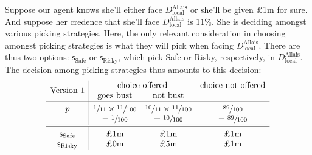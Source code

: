 \documentclass[a4paper]{article}
\newcommand\Tstrut{\rule{0pt}{2.6ex}}       %
\newcommand\Bstrut{\rule[-0.9ex]{0pt}{0pt}} %
\newcommand\s{\mathsf{s}}
\newenvironment{CCM rewritten}
{\begingroup\color{blue}} %
{\endgroup}              %
\begin{document}
Suppose our agent knows she'll either face $D^{\mathrm{Allais}}_{\mathrm{local}}$ or she'll be given \pounds1m for sure. And suppose her credence that she'll face $D^{\mathrm{Allais}}_{\mathrm{local}}$ is $11\%$. She is deciding amongst various picking strategies. 
Here, the only relevant consideration in choosing amongst picking strategies is what they will pick when facing $D^{\mathrm{Allais}}_{\mathrm{local}}$. There are thus two options: $\s_{\mathrm{Safe}}$ or $\s_{\mathrm{Risky}}$, which pick Safe or Risky, respectively, in $D^{\mathrm{Allais}}_{\mathrm{local}}$. 
The decision among picking strategies thus amounts to this decision:
%
%
	$$
\begin{array}{c|ccc}
	\multirow{2}{*}{\text{Version 1}}	&\multicolumn{2}{c}{\text{choice offered}}&\text{choice not offered}\\
	& \text{goes bust} &  \text{not bust}  \Bstrut\\\hline\Tstrut	
	p &  \sfrac{1}{11} \times \sfrac{11}{100} & \sfrac{10}{11}\times\sfrac{11}{100} & \sfrac{89}{100} \\
	& = \sfrac{1}{100} & = \sfrac{10}{100} & = \sfrac{89}{100}
		\Bstrut\\\hline\hline\Tstrut	
	\s_{\mathrm{Safe}} & \text{\pounds 1m}&\text{\pounds 1m}         &\text{\pounds 1m}               \\
	\s_{\mathrm{Risky}}& \text{\pounds 0m}&\text{\pounds 5m}& \text{\pounds 1m}
\end{array}
$$
\end{document}
